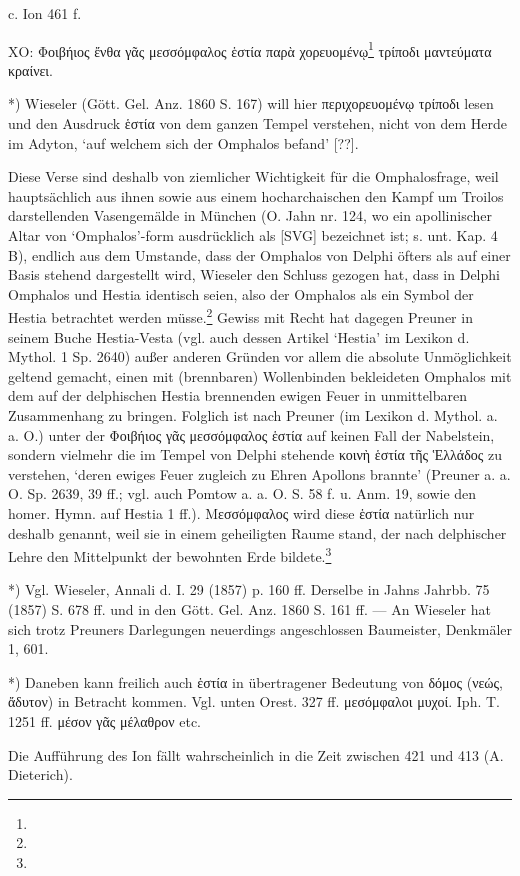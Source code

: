 \documentclass[a4paper, 11pt, oneside]{article}
\begin{document}
c. Ion 461 f.

ΧΟ:  
Φοιβήιος ἔνθα γᾶς  
μεσσόμφαλος ἑστία  
παρὰ χορευομένῳ\footnote{} τρίποδι  
μαντεύματα κραίνει.

*) Wieseler (Gött. Gel. Anz. 1860 S. 167) will hier περιχορευομένῳ τρίποδι lesen und den Ausdruck ἑστία von dem ganzen Tempel verstehen, nicht von dem Herde im Adyton, `auf welchem sich der Omphalos befand' [??].

Diese Verse sind deshalb von ziemlicher Wichtigkeit für die Omphalosfrage, weil hauptsächlich aus ihnen sowie aus einem hocharchaischen den Kampf um Troilos darstellenden Vasengemälde in München (O. Jahn nr. 124, wo ein apollinischer Altar von `Omphalos'-form ausdrücklich als [SVG] bezeichnet ist; s. unt. Kap. 4 B), endlich aus dem Umstande, dass der Omphalos von Delphi öfters als auf einer Basis stehend dargestellt wird, Wieseler den Schluss gezogen hat, dass in Delphi Omphalos und Hestia identisch seien, also der Omphalos als ein Symbol der Hestia betrachtet werden müsse.\footnote{} Gewiss mit Recht hat dagegen Preuner in seinem Buche Hestia-Vesta (vgl. auch dessen Artikel `Hestia' im Lexikon d. Mythol. 1 Sp. 2640) außer anderen Gründen vor allem die absolute Unmöglichkeit geltend gemacht, einen mit (brennbaren) Wollenbinden bekleideten Omphalos mit dem auf der delphischen Hestia brennenden ewigen Feuer in unmittelbaren Zusammenhang zu bringen. Folglich ist nach Preuner (im Lexikon d. Mythol. a. a. O.) unter der Φοιβήιος γᾶς μεσσόμφαλος ἑστία auf keinen Fall der Nabelstein, sondern vielmehr die im Tempel von Delphi stehende κοινὴ ἑστία τῆς Ἑλλάδος zu verstehen, `deren ewiges Feuer zugleich zu Ehren Apollons brannte' (Preuner a. a. O. Sp. 2639, 39 ff.; vgl. auch Pomtow a. a. O. S. 58 f. u. Anm. 19, sowie den homer. Hymn. auf Hestia 1 ff.). Μεσσόμφαλος wird diese ἑστία natürlich nur deshalb genannt, weil sie in einem geheiligten Raume stand, der nach delphischer Lehre den Mittelpunkt der bewohnten Erde bildete.\footnote{}

*) Vgl. Wieseler, Annali d. I. 29 (1857) p. 160 ff. Derselbe in Jahns Jahrbb. 75 (1857) S. 678 ff. und in den Gött. Gel. Anz. 1860 S. 161 ff. --- An Wieseler hat sich trotz Preuners Darlegungen neuerdings angeschlossen Baumeister, Denkmäler 1, 601.

*) Daneben kann freilich auch ἑστία in übertragener Bedeutung von δόμος (νεώς, ἄδυτον) in Betracht kommen. Vgl. unten Orest. 327 ff. μεσόμφαλοι μυχοί. Iph. T. 1251 ff. μέσον γᾶς μέλαθρον etc.

Die Aufführung des Ion fällt wahrscheinlich in die Zeit zwischen 421 und 413 (A. Dieterich).
\end{document}
